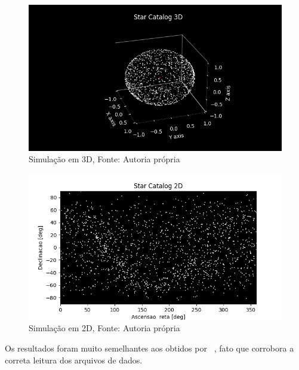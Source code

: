 \begin{figure}[H]
    \centering
    \includegraphics[width=1\columnwidth]{images/my_3D.png}
    \caption{Simulação em 3D, Fonte: Autoria própria}
    \label{fig:my_3D}
\end{figure}

\begin{figure}[H]
    \centering
    \includegraphics[width=1\columnwidth]{images/my_2D.png}
    \caption{Simulação em 2D, Fonte: Autoria própria}
    \label{fig:my_2D}
\end{figure}

Os resultados foram muito semelhantes aos obtidos por ~\cite[]{Diaz}, 
fato que corrobora a correta leitura dos arquivos de dados.
